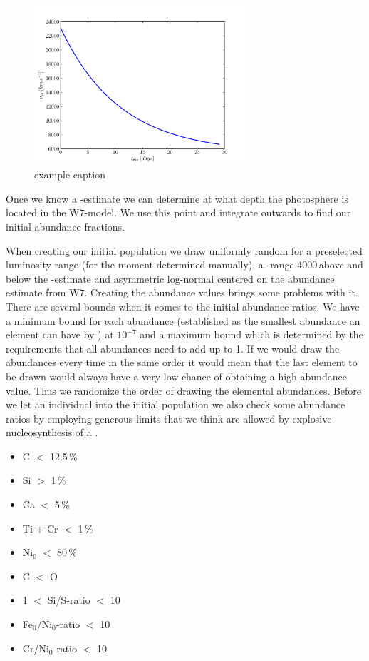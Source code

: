 \begin{figure}[htbp] %
   \centering
   \includegraphics[width=0.7\textwidth]{chapter_dalek/plots/plot_texp_vph.pdf} 
   \caption{example caption}
   \label{fig:Intrinsic }
\end{figure} 

Once we know a \vph-estimate we can determine at what depth the photosphere is located in the W7-model. We use this point and integrate outwards to find our initial abundance fractions.

When creating our initial population we draw uniformly random for a preselected luminosity range (for the moment determined manually), a \vph-range 4000\,\kms above and below the \vph-estimate and asymmetric log-normal centered on the abundance estimate from W7. Creating the abundance values brings some problems with it. There are several bounds when it comes to the initial abundance ratios. We have a minimum bound for each abundance (established as the smallest abundance an element can have by \mlc) at $10^{-7}$ and a maximum bound which is determined by the requirements that all abundances need to add up to 1. If we would draw the abundances every time in the same order it would mean that the last element to be drawn would always have a very low chance of obtaining a high abundance value. Thus we randomize the order of drawing the elemental abundances.  Before we let an individual into the initial population we also check some abundance ratios by employing generous limits that we think are allowed by explosive nucleosynthesis of a \cowd \citep[e.g.][]{1999ApJS..125..439I}. 

\begin{itemize}
\item C $<$ 12.5\,\%
\item Si $>$ 1\,\%
\item Ca $<$ 5\,\%
\item Ti + Cr $<$ 1\,\%
\item $\textrm{Ni}_0$ $<$ 80\,\%
\item C $<$ O
\item 1 $<$ Si/S-ratio $<$ 10
\item Fe$_0$/Ni$_0$-ratio $<$ 10
\item Cr/Ni$_0$-ratio $<$ 10
\end{itemize}


